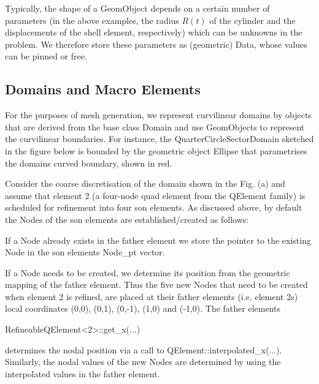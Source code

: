 Typically, the shape of a {\ttfamily Geom\+Object} depends on a certain number of parameters (in the above examples, the radius $ R(t) $ of the cylinder and the displacements of the shell element, respectively) which can be unknowns in the problem. We therefore store these parameters as (geometric) {\ttfamily Data}, whose values can be pinned or free.\hypertarget{index_MacroElements}{}\subsection{Domains and Macro Elements}\label{index_MacroElements}
For the purposes of mesh generation, we represent curvilinear domains by objects that are derived from the base class {\ttfamily Domain} and use {\ttfamily Geom\+Objects} to represent the curvilinear boundaries. For instance, the {\ttfamily Quarter\+Circle\+Sector\+Domain} sketched in the figure below is bounded by the geometric object {\ttfamily Ellipse} that parametrises the domain\textquotesingle{}s curved boundary, shown in red.

Consider the coarse discretisation of the domain shown in the Fig. (a) and assume that element 2 (a four-\/node quad element from the {\ttfamily Q\+Element} family) is scheduled for refinement into four son elements. As discussed above, by default the {\ttfamily Nodes} of the son elements are established/created as follows\+:
\begin{DoxyItemize}
\item If a {\ttfamily Node} already exists in the father element we store the pointer to the existing {\ttfamily Node} in the son element\textquotesingle{}s {\ttfamily Node\+\_\+pt} vector.
\item If a {\ttfamily Node} needs to be created, we determine its position from the geometric mapping of the father element. Thus the five new {\ttfamily Nodes} that need to be created when element 2 is refined, are placed at their father element\textquotesingle{}s (i.\+e. element 2\textquotesingle{}s) local coordinates (0,0), (0,1), (0,-\/1), (1,0) and (-\/1,0). The father element\textquotesingle{}s 
\begin{DoxyCode}
RefineableQElement<2>::get\_x(...) 
\end{DoxyCode}
 determines the nodal position via a call to {\ttfamily Q\+Element\+::interpolated\+\_\+x}(...). Similarly, the nodal values of the new {\ttfamily Nodes} are determined by using the interpolated values in the father element.
\end{DoxyItemize}


